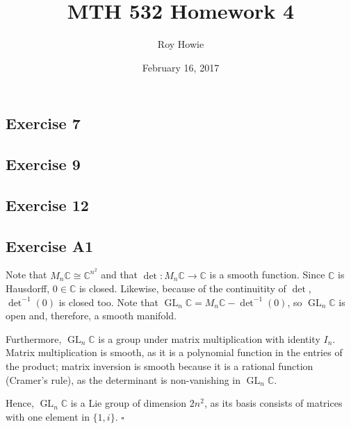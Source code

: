 \documentclass{article}
\newcommand{\C}{\mathbb{C}}
\DeclareMathOperator{\GL}{GL}
\begin{document}
\title{MTH 532 Homework 4}
\author{Roy Howie}
\date{February 16, 2017}
\maketitle

\subsection*{Exercise 7}
\subsection*{Exercise 9}
\subsection*{Exercise 12}

\subsection*{Exercise A1}
  Note that $M_n\C\cong\C^{n^2}$ and that $\det\colon M_n\C\to\C$ is a smooth
  function. Since $\C$ is Hausdorff, $0\in\C$ is closed. Likewise, because of
  the continuitity of $\det$, $\det^{-1}(0)$ is closed too. Note that $\GL_n\C=
  M_n\C-\det^{-1}(0)$, so $\GL_n\C$ is open and, therefore, a smooth manifold.

  Furthermore, $\GL_n\C$ is a group under matrix multiplication with identity
  $I_n$. Matrix multiplication is smooth, as it is a polynomial function in the
  entries of the product; matrix inversion is smooth because it is a rational
  function (Cramer's rule), as the determinant is non-vanishing in $\GL_n\C$.

  Hence, $\GL_n\C$ is a Lie group of dimension $2n^2$, as its basis consists of
  matrices with one element in $\{1,i\}$.
  \hfill $\square$
\end{document}
